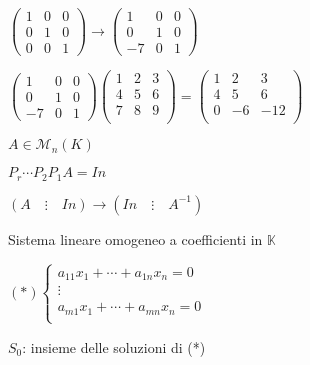 \documentclass{article}
\newcommand{\K}{\mathbb{K}}
\newcommand{\M}{\mathcal{M}}
\begin{document}
$\begin{pmatrix}
	1 & 0 & 0 \\
	0 & 1 & 0 \\
	0 & 0 & 1
\end{pmatrix}\rightarrow
\begin{pmatrix}
	1  & 0 & 0 \\
	0  & 1 & 0 \\
	-7 & 0 & 1
\end{pmatrix}$

$\begin{pmatrix}
	1  & 0 & 0 \\
	0  & 1 & 0 \\
	-7 & 0 & 1
\end{pmatrix}
\begin{pmatrix}
	1 & 2 & 3 \\
	4 & 5 & 6 \\
	7 & 8 & 9 \\
\end{pmatrix}=
\begin{pmatrix}
	1 & 2  & 3   \\
	4 & 5  & 6   \\
	0 & -6 & -12 \\
\end{pmatrix}$

$A\in \M_n(K)$

$P_r\cdots P_2P_1A=In$

$(A\quad\vdots\quad In)\rightarrow(In\quad\vdots\quad A^{-1})$

Sistema lineare omogeneo a coefficienti in $\K$

$(*)\begin{cases}
	a_{11}x_1+\cdots+a_{1n}x_n=0 \\
	\vdots                       \\
	a_{m1}x_1+\cdots+a_{mn}x_n=0 \\
\end{cases}$

$S_0$: insieme delle soluzioni di (*)
\end{document}
